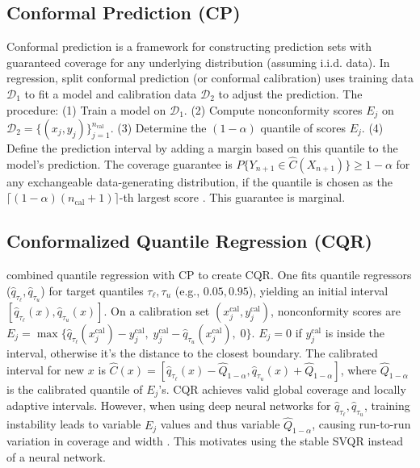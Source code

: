 \documentclass{article}
\begin{document}
\subsection{Conformal Prediction (CP)}
Conformal prediction \citep{Shafer2008TutorialOC, Vovk2005AlgorithmicLI} is a framework for constructing prediction sets with guaranteed coverage for any underlying distribution (assuming i.i.d. data). In regression, split conformal prediction (or conformal calibration) uses training data $\mathcal{D}_1$ to fit a model and calibration data $\mathcal{D}_2$ to adjust the prediction. The procedure: (1) Train a model on $\mathcal{D}_1$. (2) Compute nonconformity scores $E_j$ on $\mathcal{D}_2 = \{(x_j, y_j)\}_{j=1}^{n_{\text{cal}}}$. (3) Determine the $(1-\alpha)$ quantile of scores $E_j$. (4) Define the prediction interval by adding a margin based on this quantile to the model's prediction. The coverage guarantee is $P\{ Y_{n+1} \in \hat{C}(X_{n+1}) \} \ge 1-\alpha$ for any exchangeable data-generating distribution, if the quantile is chosen as the $\lceil (1-\alpha)(n_{\text{cal}}+1)\rceil$-th largest score \citep{Lei2018DistributionFreePC}. This guarantee is marginal.

\subsection{Conformalized Quantile Regression (CQR)}
\cite{Romano2019ConformalizedQR} combined quantile regression with CP to create CQR. One fits quantile regressors ($\hat{q}_{\tau_{\ell}}, \hat{q}_{\tau_{u}}$) for target quantiles $\tau_{\ell}, \tau_{u}$ (e.g., $0.05, 0.95$), yielding an initial interval $[\hat{q}_{\tau_{\ell}}(x), \hat{q}_{\tau_{u}}(x)]$. On a calibration set $(x_j^{\text{cal}}, y_j^{\text{cal}})$, nonconformity scores are $E_j = \max\{ \hat{q}_{\tau_{\ell}}(x_j^{\text{cal}}) - y_j^{\text{cal}},\; y_j^{\text{cal}} - \hat{q}_{\tau_{u}}(x_j^{\text{cal}}),\; 0 \}$. $E_j=0$ if $y_j^{\text{cal}}$ is inside the interval, otherwise it's the distance to the closest boundary. The calibrated interval for new $x$ is $\hat{C}(x) = [\hat{q}_{\tau_{\ell}}(x) - \hat{Q}_{1-\alpha}, \hat{q}_{\tau_{u}}(x) + \hat{Q}_{1-\alpha}]$, where $\hat{Q}_{1-\alpha}$ is the calibrated quantile of $E_j$'s. CQR achieves valid global coverage and locally adaptive intervals. However, when using deep neural networks for $\hat{q}_{\tau_{\ell}}, \hat{q}_{\tau_{u}}$, training instability leads to variable $E_j$ values and thus variable $\hat{Q}_{1-\alpha}$, causing run-to-run variation in coverage and width \citep{Xu2020UnderTH, Park2022UnderstandingUB}. This motivates using the stable SVQR instead of a neural network.
\end{document}
